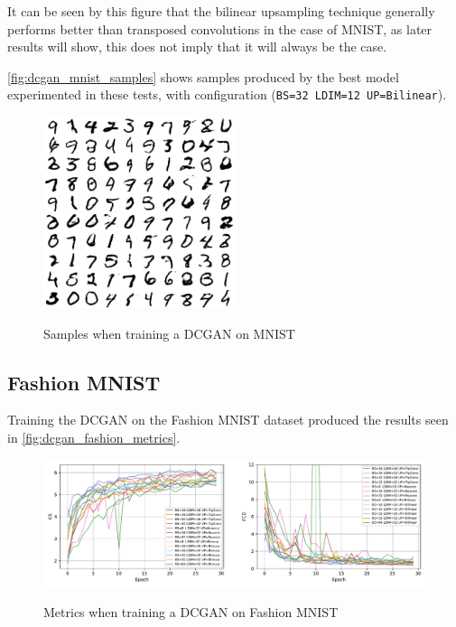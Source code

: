 It can be seen by this figure that the bilinear upsampling technique generally performs better than transposed convolutions in the case of \gls{MNIST}, as later results will show, this does not imply that it will always be the case.

\autoref{fig:dcgan_mnist_samples} shows samples produced by the best model experimented in these tests, with configuration (\texttt{BS=32 LDIM=12 UP=Bilinear}).
\begin{figure}[hbt]
    \centering
    \caption{Samples when training a DCGAN on MNIST}
    \includegraphics[width=0.5\textwidth]{chapters/Experiments/DCGAN/mnist_samples.png}
    \label{fig:dcgan_mnist_samples}
\end{figure}


\subsection{Fashion MNIST}
Training the \gls{DCGAN} on the Fashion MNIST dataset produced the results seen in \autoref{fig:dcgan_fashion_metrics}.
\begin{figure}[hbt]
    \centering
    \caption{Metrics when training a DCGAN on Fashion MNIST}
    \includegraphics[width=\textwidth]{chapters/Experiments/DCGAN/fashion_metrics.pdf}
    \label{fig:dcgan_fashion_metrics}
\end{figure}

